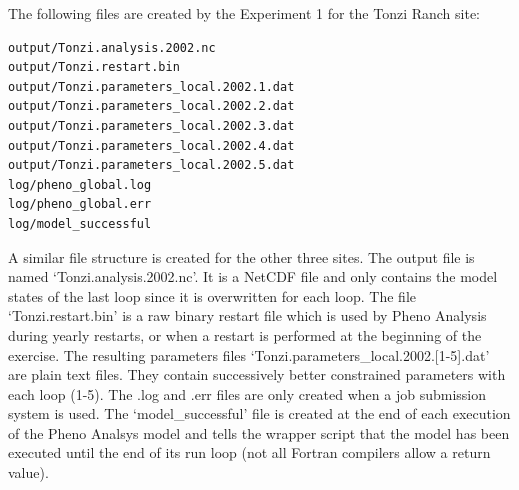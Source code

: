 \documentclass[a4paper,12pt]{article}
\begin{document}
The following files are created by the Experiment 1 for the Tonzi Ranch site:
\begin{verbatim}
output/Tonzi.analysis.2002.nc
output/Tonzi.restart.bin
output/Tonzi.parameters_local.2002.1.dat
output/Tonzi.parameters_local.2002.2.dat
output/Tonzi.parameters_local.2002.3.dat
output/Tonzi.parameters_local.2002.4.dat
output/Tonzi.parameters_local.2002.5.dat
log/pheno_global.log
log/pheno_global.err
log/model_successful
\end{verbatim}
A similar file structure is created for the other three sites. The output file is named `Tonzi.analysis.2002.nc'. It is a NetCDF file and only contains the model states of the last loop since it is overwritten for each loop. The file `Tonzi.restart.bin' is a raw binary restart file which is used by Pheno Analysis during yearly restarts, or when a restart is performed at the beginning of the exercise. The resulting parameters files `Tonzi.parameters\_local.2002.[1-5].dat' are plain text files. They contain successively better constrained parameters with each loop (1-5). The .log and .err files are only created when a job submission system is used. The `model\_successful' file is created at the end of each execution of the Pheno Analsys model and tells the wrapper script that the model has been executed until the end of its run loop (not all Fortran compilers allow a return value).
\end{document}
